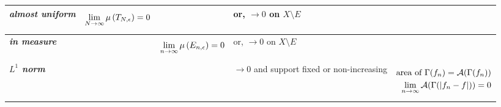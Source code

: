 \documentclass[11pt]{article}
\begin{document}
\begin{table}[h!]
\begin{tabularx}{1\textwidth} { 
  | >{\raggedright\arraybackslash} m{2cm}
  | >{\centering\arraybackslash}X
  | >{\centering\arraybackslash}X
  | >{\centering\arraybackslash}X
  | >{\centering\arraybackslash}X  | }
\hline
 \emph{\textbf{almost uniform}} & 
  \begin{align*}
 \lim\limits_{N \rightarrow \infty}\mu\left(T_{N,\epsilon}\right) = 0
\end{align*} 
 & & or, $\rightarrow 0$ on $X \setminus E$  &\\
 \hline
 \emph{\textbf{in measure}} & &
  \begin{align*}
 \lim\limits_{n \rightarrow \infty}\mu\left(E_{n,\epsilon}\right) = 0
\end{align*}  
  & or, $\rightarrow 0$ on $X \setminus E$ &\\
  \hline
\emph{\textbf{$L^{1}$ norm}} & & &
$\rightarrow 0$ and support fixed or non-increasing
 & 
  \begin{align*}
  \text{area of }\Gamma(f_n) = {\mathcal A}(\Gamma(f_n))\\
  \lim\limits_{n \rightarrow \infty}{\mathcal A}(\Gamma(\left\lvert f_n- f \right\rvert)) = 0
\end{align*} \\
\hline
\end{tabularx}
\end{table}

\newpage
\end{document}
